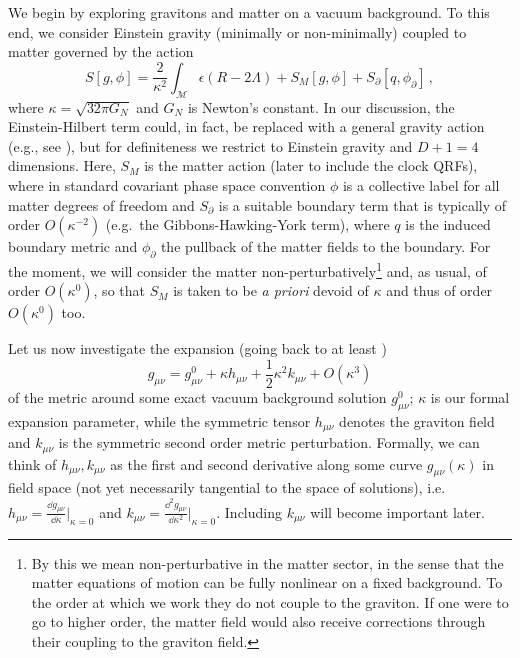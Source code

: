 \documentclass[]{jkpaper}
\theoremstyle{plain}
\theoremstyle{definition}
\begin{document}
We begin by exploring gravitons and matter on a vacuum background. To this end, we consider Einstein gravity (minimally or non-minimally) coupled to matter governed by the action 
\begin{equation}\label{fullaction}
    S[g,\phi]=\frac{2}{\kappa^2}\int_\mathcal{M}\epsilon(R-2\Lambda)+S_M[g,\phi]+S_\partial[q,\phi_\partial]\,,
\end{equation}
where $\kappa=\sqrt{32\pi G_N}$ and $G_N$ is Newton's constant. In our discussion, the Einstein-Hilbert term could, in fact, be replaced with a general gravity action (e.g., see \cite{Altas:2017fcp,Altas:2018dci}), but for definiteness we restrict to Einstein gravity and $D+1=4$ dimensions. Here, $S_M$ is the matter action (later to include the clock QRFs), where in standard covariant phase space convention $\phi$ is a collective label for all matter degrees of freedom and  $S_\partial$ is a suitable boundary term that is typically of order $O(\kappa^{-2})$ (e.g.\ the Gibbons-Hawking-York term), where $q$ is the induced boundary metric and $\phi_\partial$ the pullback of the matter fields to the boundary. For the moment, we will consider the matter non-perturbatively\footnote{By this we mean non-perturbative in the matter sector, in the sense that the matter equations of motion can be fully nonlinear on a fixed background. To the order at which we work they do not couple to the graviton.  If one were to go to higher order, the matter field would also receive corrections through their coupling to the graviton field.} and, as usual, of order $O(\kappa^0)$, so that $S_M$ is taken to be \emph{a priori} devoid of $\kappa$ and thus of order $O(\kappa^0)$ too.



Let us now investigate the expansion (going back to at least \cite{Taub1})
\begin{equation}
    g_{\mu \nu}=g_{\mu \nu}^0+\kappa h_{\mu \nu}+\frac{1}{2}\kappa^2 k_{\mu \nu}+O(\kappa^3)
\end{equation} 
of the metric around some exact vacuum background solution $g_{\mu \nu}^0$; $\kappa$ is our formal expansion parameter, while the symmetric tensor $h_{\mu \nu}$ denotes the graviton field and $k_{\mu \nu}$ is the symmetric second order metric perturbation. Formally, we can think of $h_{\mu \nu},k_{\mu \nu}$ as the first and second derivative along some curve $g_{\mu \nu}(\kappa)$ in field space (not yet necessarily tangential to the space of solutions), i.e.\ $h_{\mu \nu}=\frac{\dd{g_{\mu \nu}}}{\dd{\kappa}}\big|_{\kappa=0}$ and $k_{\mu \nu}=\frac{\dd^2{g_{\mu \nu}}}{\dd{\kappa}^2}\big|_{\kappa=0}$. Including $k_{\mu \nu}$ will become important later. 
\end{document}
